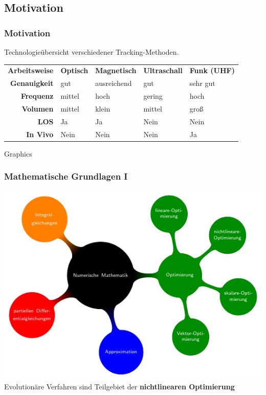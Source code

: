 \subsection{Motivation}
\begin{frame} %
  	\frametitle{Motivation}
  	\begin{center}
  	\small Technologieübersicht verschiedener Tracking-Methoden.
  	\end{center}
%
	\begin{table} [H]
		\begin{center}
			\begin{tabular}{rllll}
				\textbf{Arbeitsweise} & \textbf{Optisch} & \textbf{Magnetisch} & \textbf{Ultraschall} & \textbf{ Funk (UHF)} \\
				\textbf{Genauigkeit} & gut & ausreichend & gut & sehr gut \\
				\textbf{Frequenz} & mittel & hoch & gering & hoch \\
				\textbf{Volumen} & mittel & klein & mittel & groß \\
				\textbf{LOS} & Ja & Ja & Nein & Nein \\
				\textbf{In Vivo} & Nein   & Nein & Nein & Ja \\
%			
			\end{tabular}
		\end{center}
		\label{tab:overview_tracking}
	\end{table}  	
\end{frame}
\begin{frame}{Graphics} 
	\frametitle{Mathematische Grundlagen I }
	\centering
	\includegraphics[page=1, width=.6\textwidth]{../img/mindmap.pdf}\\
	\tiny Evolutionäre Verfahren sind Teilgebiet der \textbf{nichtlinearen Optimierung}
\end{frame}
